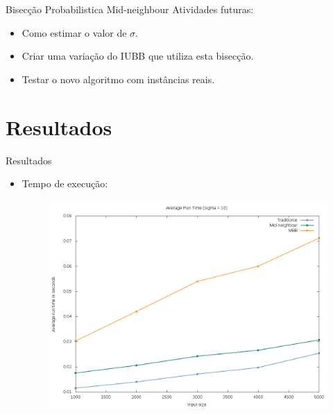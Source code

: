 \documentclass{beamer}
\begin{document}
\begin{frame}{Bisecção Probabilistica Mid-neighbour}
    Atividades futuras:
    \begin{itemize}
        \item{Como estimar o valor de $\sigma$.}
        \item{Criar uma variação do IUBB que utiliza esta bisecção.}
        \item{Testar o novo algoritmo com instâncias reais.}
    \end{itemize}
\end{frame}

\section{Resultados}
\begin{frame}{Resultados}
    \begin{itemize}
        \item{Tempo de execução:}
            \begin{figure}[h]
            \includegraphics[scale=.3]{time_result}
        \end{figure}

    \end{itemize}
\end{frame}
\end{document}
